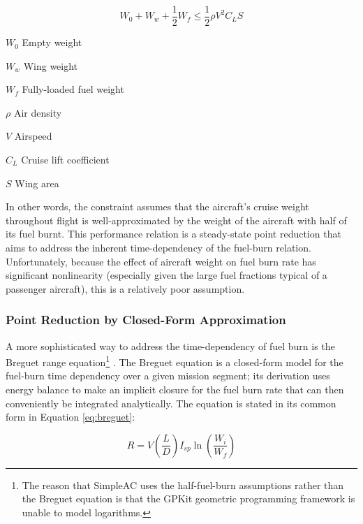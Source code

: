 \begin{equation}
    W_0 + W_w + \frac{1}{2} W_f \leq \frac{1}{2}\rho V^2 C_L S
    \label{eq:simpleac-lift}
\end{equation}

\begin{eqexpl}
    \item{$W_0$} Empty weight
    \item{$W_w$} Wing weight
    \item{$W_f$} Fully-loaded fuel weight
    \item{$\rho$} Air density
    \item{$V$} Airspeed
    \item{$C_L$} Cruise lift coefficient
    \item{$S$} Wing area
\end{eqexpl}

In other words, the constraint assumes that the aircraft's cruise weight throughout flight is well-approximated by the weight of the aircraft with half of its fuel burnt. This performance relation is a steady-state point reduction that aims to address the inherent time-dependency of the fuel-burn relation. Unfortunately, because the effect of aircraft weight on fuel burn rate has significant nonlinearity (especially given the large fuel fractions typical of a passenger aircraft), this is a relatively poor assumption.

\subsubsection{Point Reduction by Closed-Form Approximation}

A more sophisticated way to address the time-dependency of fuel burn is the Breguet range equation\footnote{The reason that SimpleAC uses the half-fuel-burn assumptions rather than the Breguet equation is that the GPKit geometric programming framework is unable to model logarithms.} \cite{raymer}. The Breguet equation is a closed-form model for the fuel-burn time dependency over a given mission segment; its derivation uses energy balance to make an implicit closure for the fuel burn rate that can then conveniently be integrated analytically. The equation is stated in its common form in Equation \ref{eq:breguet}:

\begin{equation}
    R = V \left(\frac{L}{D}\right) I_{sp} \ln\left(\frac{W_i}{W_f}\right)
    \label{eq:breguet}
\end{equation}

